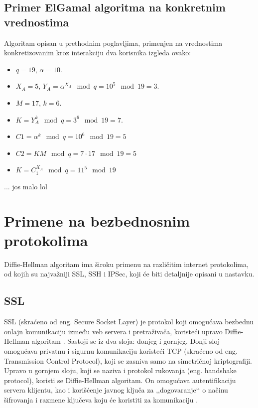 \documentclass[a4paper]{article}
\begin{document}
\subsection{Primer ElGamal algoritma na konkretnim vrednostima}
Algoritam opisan u prethodnim poglavljima, primenjen na vrednostima konkretizovanim kroz interakciju dva korisnika izgleda ovako:
\begin{itemize}
  \item $q=19$, $\alpha=10$. 
  \item $X_A=5$, $Y_A=\alpha^{X_A}\mod q=10^5\mod 19=3$.
  \item $M=17$, $k=6$.
  \item $K=Y_A^k\mod q=3^6\mod 19=7$.
  \item $C1=\alpha^k \mod q=10^6\mod 19=5$
  \item $C2=KM\mod q=7\cdot17\mod 19=5$
  \item $K=C_1^{X_A}\mod q=11^5\mod 19$
\end{itemize}
... jos malo lol


\section{Primene na bezbednosnim protokolima}
\label{sec:primene}

Diffie-Hellman algoritam ima široku primenu na različitim internet protokolima, od kojih su najvažniji SSL, SSH i IPSec, koji će biti detaljnije opisani u nastavku.

\subsection{SSL}
\label{subsec:ssl}

SSL (skraćeno od eng. Secure Socket Layer) je protokol koji omogućava bezbednu onlajn komunikaciju između veb servera i pretraživača, koristeći upravo Diffie-Hellman algoritam \cite{use}. Sastoji se iz dva sloja: donjeg i gornjeg. Donji sloj omogućava privatnu i sigurnu komunikaciju koristeći TCP (skraćeno od eng. Transmission Control Protocol), koji se zasniva samo na simetričnoj kriptografiji. Upravo u gornjem sloju, koji se naziva i protokol rukovanja (eng. handshake protocol), koristi se Diffie-Hellman algoritam. On omogućava autentifikaciju servera klijentu, kao i korišćenje javnog ključa za ,,dogovaranje‘‘ o načinu šifrovanja i razmene ključeva koju će koristiti za komunikaciju \cite{use}. 

\end{document}
